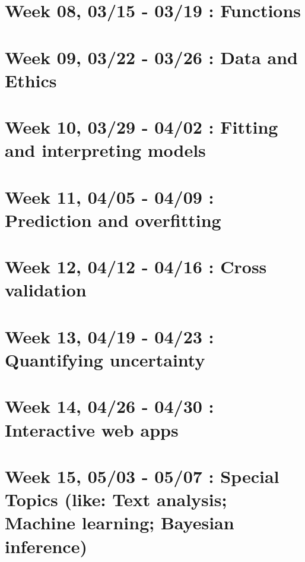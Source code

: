 \documentclass[
]{book}
\begin{document}
\hypertarget{week-08-0315---0319-functions}{%
\section{Week 08, 03/15 - 03/19 : Functions}\label{week-08-0315---0319-functions}}

\hypertarget{week-09-0322---0326-data-and-ethics}{%
\section{Week 09, 03/22 - 03/26 : Data and Ethics}\label{week-09-0322---0326-data-and-ethics}}

\hypertarget{week-10-0329---0402-fitting-and-interpreting-models}{%
\section{Week 10, 03/29 - 04/02 : Fitting and interpreting models}\label{week-10-0329---0402-fitting-and-interpreting-models}}

\hypertarget{week-11-0405---0409-prediction-and-overfitting}{%
\section{Week 11, 04/05 - 04/09 : Prediction and overfitting}\label{week-11-0405---0409-prediction-and-overfitting}}

\hypertarget{week-12-0412---0416-cross-validation}{%
\section{Week 12, 04/12 - 04/16 : Cross validation}\label{week-12-0412---0416-cross-validation}}

\hypertarget{week-13-0419---0423-quantifying-uncertainty}{%
\section{Week 13, 04/19 - 04/23 : Quantifying uncertainty}\label{week-13-0419---0423-quantifying-uncertainty}}

\hypertarget{week-14-0426---0430-interactive-web-apps}{%
\section{Week 14, 04/26 - 04/30 : Interactive web apps}\label{week-14-0426---0430-interactive-web-apps}}

\hypertarget{week-15-0503---0507-special-topics-like-text-analysis-machine-learning-bayesian-inference}{%
\section{Week 15, 05/03 - 05/07 : Special Topics (like: Text analysis; Machine learning; Bayesian inference)}\label{week-15-0503---0507-special-topics-like-text-analysis-machine-learning-bayesian-inference}}
\end{document}
